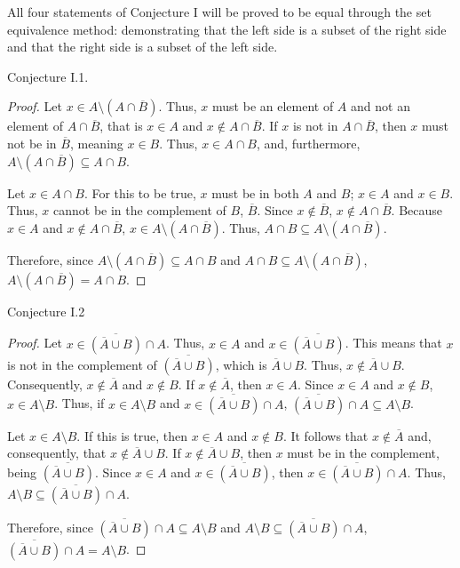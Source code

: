 \documentclass[11pt,titlepage]{article}		%
\theoremstyle{theorem}
\begin{document}
All four statements of Conjecture I will be proved to be equal through the set equivalence method: demonstrating that the left side is a subset of the right side and that the right side is a subset of the left side.

Conjecture I.1.
\begin{proof}
Let $x\in A\setminus{(A \cap\overline{B})}$. Thus, $x$ must be an element of $A$ and not an element of $A\cap\overline{B}$, that is $x\in A$ and $x\not\in A\cap\overline{B}$. If $x$ is not in $A\cap\overline{B}$, then $x$ must not be in $\overline{B}$, meaning $x\in B$. Thus, $x\in A\cap B$, and, furthermore, $A\setminus{(A\cap\overline{B})}\subseteq A\cap B$.

Let $x\in A\cap B$. For this to be true, $x$ must be in both $A$ and $B$; $x\in A$ and $x\in B$. Thus, $x$ cannot be in the complement of $B$, $\overline{B}$. Since $x\not\in\overline{B}$, $x\not\in A\cap\overline{B}$. Because $x\in A$ and $x\not\in A\cap\overline{B}$, $x \in A\setminus{(A\cap\overline{B})}$. Thus, $A\cap B \subseteq A\setminus{(A\cap\overline{B})}$.

Therefore, since $A\setminus{(A\cap\overline{B})}\subseteq A\cap B$ and $A\cap B \subseteq A\setminus{(A\cap\overline{B})}$, $A\setminus{(A\cap\overline{B})} = A\cap B$.
\end{proof}

Conjecture I.2
\begin{proof}
Let $x \in \overline{(\overline{A}\cup B)}\cap A$. Thus, $x \in A$ and $ x\in \overline{(\overline{A}\cup B)}$. This means that $x$ is not in the complement of $\overline{(\overline{A}\cup B)}$, which is $\overline{A} \cup B$. Thus, $x\not\in\overline{A}\cup B$. Consequently, $x \not\in \overline{A}$ and $x\not\in B$. If $x \not\in\overline{A}$, then $x\in A$. Since $x\in A$ and $x\not\in B$, $x\in A\setminus B$. Thus, if $x \in A\setminus B$ and $x \in \overline{(\overline{A}\cup B)}\cap A$, $\overline{(\overline{A}\cup B)}\cap A \subseteq A \setminus B$.

Let $x \in A\setminus B$. If this is true, then $x \in A$ and $x\not\in B$. It follows that $x\not\in\overline{A}$ and, consequently, that $x\not\in\overline{A}\cup B$. If $x\not\in\overline{A}\cup B$, then $x$ must be in the complement, being $\overline{(\overline{A}\cup B)}$. Since $x \in A$ and $x \in \overline{(\overline{A}\cup B)}$, then $x\in \overline{(\overline{A}\cup B)}\cap A$. Thus, $A\setminus B \subseteq \overline{(\overline{A}\cup B)}\cap A$.

Therefore, since $\overline{(\overline{A}\cup B)}\cap A \subseteq A \setminus B$ and $A\setminus B \subseteq \overline{(\overline{A}\cup B)}\cap A$, $\overline{(\overline{A}\cup B)}\cap A = A \setminus B$.
\end{proof}
\end{document}
